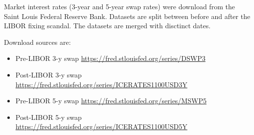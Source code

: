 \documentclass[11pt,]{report}
\begin{document}
Market interest rates (3-year and 5-year swap rates) were download from the Saint Louis Federal Reserve Bank. Datasets are split between before and after the LIBOR fixing scandal. The datasets are merged with disctinct dates.

Download sources are:

\begin{itemize}
\item
  Pre-LIBOR 3-y swap \url{https://fred.stlouisfed.org/series/DSWP3}
\item
  Post-LIBOR 3-y swap \url{https://fred.stlouisfed.org/series/ICERATES1100USD3Y}
\item
  Pre-LIBOR 5-y swap \url{https://fred.stlouisfed.org/series/MSWP5}
\item
  Post-LIBOR 5-y swap \url{https://fred.stlouisfed.org/series/ICERATES1100USD5Y}
\end{itemize}

\small
\end{document}
